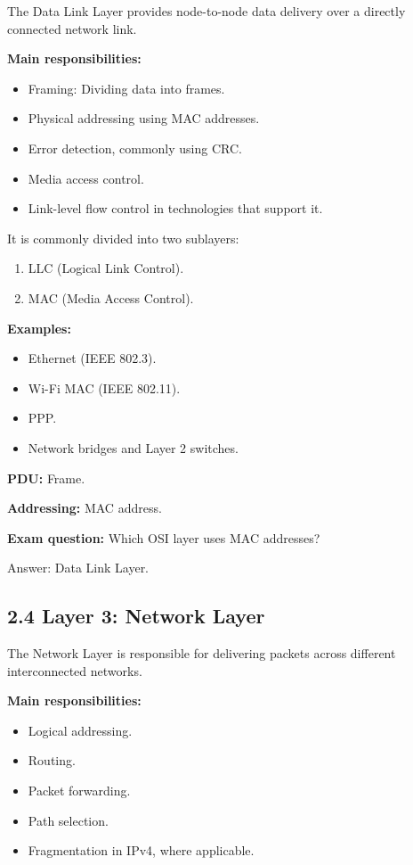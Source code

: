 The Data Link Layer provides node-to-node data delivery over a directly connected network link.

\textbf{Main responsibilities:}

\begin{itemize}
    \item Framing: Dividing data into frames.
    \item Physical addressing using MAC addresses.
    \item Error detection, commonly using CRC.
    \item Media access control.
    \item Link-level flow control in technologies that support it.
\end{itemize}

It is commonly divided into two sublayers:

\begin{enumerate}
    \item LLC (Logical Link Control).
    \item MAC (Media Access Control).
\end{enumerate}

\textbf{Examples:}

\begin{itemize}
    \item Ethernet (IEEE 802.3).
    \item Wi-Fi MAC (IEEE 802.11).
    \item PPP.
    \item Network bridges and Layer 2 switches.
\end{itemize}

\textbf{PDU:} Frame.

\textbf{Addressing:} MAC address.

\textbf{Exam question:} Which OSI layer uses MAC addresses?

Answer: Data Link Layer.

\subsection{2.4 Layer 3: Network Layer}

The Network Layer is responsible for delivering packets across different interconnected networks.

\textbf{Main responsibilities:}

\begin{itemize}
    \item Logical addressing.
    \item Routing.
    \item Packet forwarding.
    \item Path selection.
    \item Fragmentation in IPv4, where applicable.
\end{itemize}

